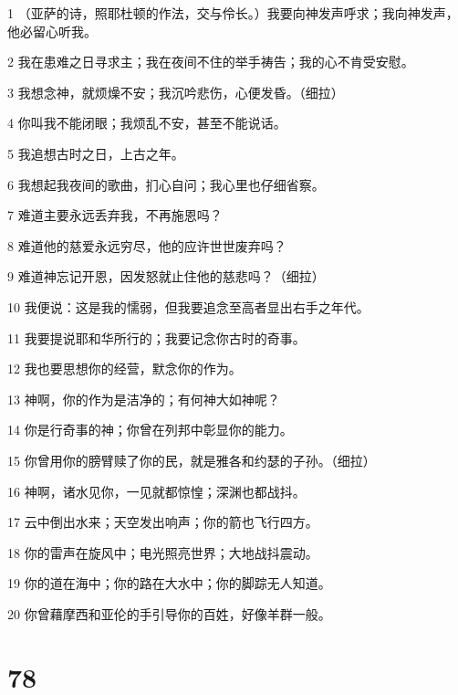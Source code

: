 \par 1 （亚萨的诗，照耶杜顿的作法，交与伶长。）我要向神发声呼求；我向神发声，他必留心听我。
\par 2 我在患难之日寻求主；我在夜间不住的举手祷告；我的心不肯受安慰。
\par 3 我想念神，就烦燥不安；我沉吟悲伤，心便发昏。（细拉）
\par 4 你叫我不能闭眼；我烦乱不安，甚至不能说话。
\par 5 我追想古时之日，上古之年。
\par 6 我想起我夜间的歌曲，扪心自问；我心里也仔细省察。
\par 7 难道主要永远丢弃我，不再施恩吗？
\par 8 难道他的慈爱永远穷尽，他的应许世世废弃吗？
\par 9 难道神忘记开恩，因发怒就止住他的慈悲吗？（细拉）
\par 10 我便说：这是我的懦弱，但我要追念至高者显出右手之年代。
\par 11 我要提说耶和华所行的；我要记念你古时的奇事。
\par 12 我也要思想你的经营，默念你的作为。
\par 13 神啊，你的作为是洁净的；有何神大如神呢？
\par 14 你是行奇事的神；你曾在列邦中彰显你的能力。
\par 15 你曾用你的膀臂赎了你的民，就是雅各和约瑟的子孙。（细拉）
\par 16 神啊，诸水见你，一见就都惊惶；深渊也都战抖。
\par 17 云中倒出水来；天空发出响声；你的箭也飞行四方。
\par 18 你的雷声在旋风中；电光照亮世界；大地战抖震动。
\par 19 你的道在海中；你的路在大水中；你的脚踪无人知道。
\par 20 你曾藉摩西和亚伦的手引导你的百姓，好像羊群一般。

\chapter{78}

